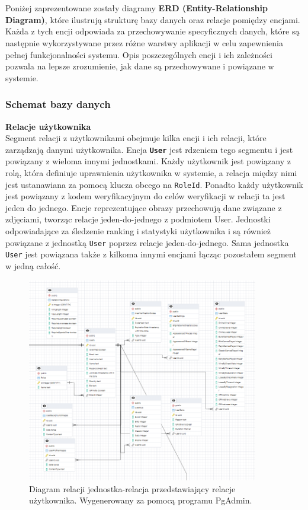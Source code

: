 \documentclass[12pt,a4paper]{article}
\begin{document}
\\\\
Poniżej zaprezentowane zostały diagramy \textbf{ERD (Entity-Relationship Diagram)}, które ilustrują strukturę bazy danych oraz relacje pomiędzy encjami. Każda z tych encji odpowiada za przechowywanie specyficznych danych, które są następnie wykorzystywane przez różne warstwy aplikacji w celu zapewnienia pełnej funkcjonalności systemu. Opis poszczególnych encji i ich zależności pozwala na lepsze zrozumienie, jak dane są przechowywane i powiązane w systemie.

\newpage

\subsubsection{Schemat bazy danych}

\noindent \textbf{Relacje użytkownika}\\
Segment relacji z użytkownikami obejmuje kilka encji i ich relacji, które zarządzają danymi użytkownika. Encja \textbf{\texttt{User}} jest rdzeniem tego segmentu i jest powiązany z wieloma innymi jednostkami. Każdy użytkownik jest powiązany z rolą, która definiuje uprawnienia użytkownika w systemie, a relacja między nimi jest ustanawiana za pomocą klucza obcego na \texttt{RoleId}. Ponadto każdy użytkownik jest powiązany z kodem weryfikacyjnym do celów weryfikacji w relacji ta jest jeden do jednego. Encje reprezentujące obrazy przechowują dane związane z zdjęciami, tworząc relacje jeden-do-jednego z podmiotem User. Jednostki odpowiadające za śledzenie ranking i statystyki użytkownika i są również powiązane z jednostką \texttt{User} poprzez relacje jeden-do-jednego. Sama jednostka \texttt{User} jest powiązana także z kilkoma innymi encjami łącząc pozostałem segment w jedną całość.

\vspace{0.5cm}
\begin{figure}[h!]
    \centering
    \includegraphics[width=0.9\textwidth]{images/ERD_user.png}
    \caption{Diagram relacji jednostka-relacja przedstawiający relacje użytkownika. Wygenerowany za pomocą programu PgAdmin.}
\end{figure}
\end{document}

